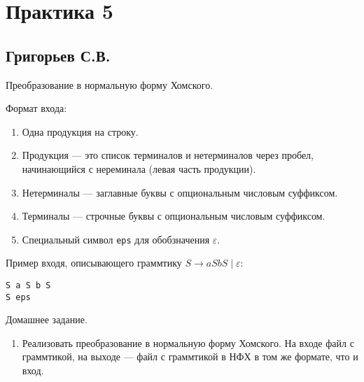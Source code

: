 \section{Практика 5}

\subsection{Григорьев С.В.}

Преобразование в нормальную форму Хомского.

Формат входа:
\begin{enumerate}
\item Одна продукция на строку.
\item Продукция --- это список терминалов и нетерминалов через пробел, начинающийся с нереминала (левая часть продукции).
\item Нетерминалы --- заглавные буквы с опциональным числовым суффиксом.
\item Терминалы --- строчные буквы с опциональным числовым суффиксом.
\item Специальный символ \verb|eps| для обобзначения $\varepsilon$.
\end{enumerate}

Пример входя, описывающего граммтику $S \to a S b S \mid \varepsilon$:

\begin{verbatim}
S a S b S
S eps 
\end{verbatim}

Домашнее задание.
\begin{enumerate}
    \item Реализовать преобразование в нормальную форму Хомского. На входе файл с граммтикой, на выходе --- файл с граммтикой в НФХ в том же формате, что и вход.
\end{enumerate} 
